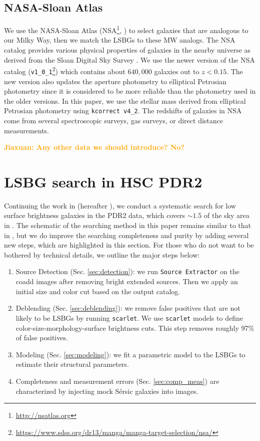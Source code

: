 \documentclass[twocolumn,astrosymb,twocolappendix]{aastex631}
\newcommand{\jiaxuan}[1]{\textcolor{orange}{\textbf{Jiaxuan: #1}}}
\newcommand{\code}[1]{\texttt{#1}}
\newcommand{\sersic}{S\'ersic}
\begin{document}
\begin{CJK*}{UTF8}{gbsn}
\subsection{NASA-Sloan Atlas}
We use the NASA-Sloan Atlas (NSA\footnote{\url{http://nsatlas.org}}, \citealt{Blanton2005,Blanton2011}) to select galaxies that are analogous to our Milky Way, then we match the LSBGs to these MW analogs. The NSA catalog provides various physical properties of galaxies in the nearby universe as derived from the Sloan Digital Sky Survey \citep[SDSS,][]{York2000}. We use the newer version of the NSA catalog (\code{v1\_0\_1}\footnote{\url{https://www.sdss.org/dr13/manga/manga-target-selection/nsa/}}) which contains about $640,000$ galaxies out to $z < 0.15$. The new version also updates the aperture photometry to elliptical Petrosian photometry since it is considered to be more reliable than the photometry used in the older versions. In this paper, we use the stellar mass derived from elliptical Petrosian photometry using \code{kcorrect v4\_2}. The redshifts of galaxies in NSA come from several spectroscopic surveys, gas surveys, or direct distance measurements. 

\jiaxuan{Any other data we should introduce? No?}

\section{LSBG search in HSC PDR2}
Continuing the work in \citet{Greco2018} (hereafter ), we conduct a systematic search for low surface brightness galaxies in the PDR2 data, which covers $\sim 1.5$ of the sky area in . The schematic of the searching method in this paper remains similar to that in , but we do improve the searching completeness and purity by adding several new steps, which are highlighted in this section. For those who do not want to be bothered by technical details, we outline the major steps below:
\begin{enumerate}
    \item Source Detection (Sec. \ref{sec:detection}): we run \code{Source Extractor} on the coadd images after removing bright extended sources. Then we apply an initial size and color cut based on the output catalog. 
    \item Deblending (Sec. \ref{sec:deblending}): we remove false positives that are not likely to be LSBGs by running \code{scarlet}. We use \code{scarlet} models to define color-size-morphology-surface brightness cuts. This step removes roughly 97\% of false positives.
    \item Modeling (Sec. \ref{sec:modeling}): we fit a parametric model to the LSBGs to estimate their structural parameters. 
    \item Completeness and measurement errors (Sec. \ref{sec:comp_meas}) are characterized by injecting mock \sersic{} galaxies into images. 
\end{enumerate}


\end{CJK*}
\end{document}
